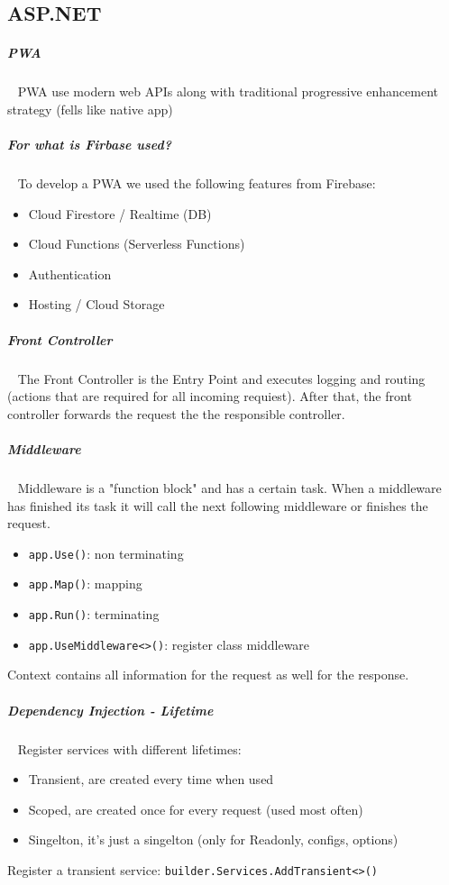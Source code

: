 \documentclass[10pt,twoside,landscape]{article}
\begin{document}
\begin{multicols}{4}
\section{ASP.NET}
\label{sec:orgca46951}
\subparagraph{PWA} \
\label{sec:orgbd677ad}
PWA use modern web APIs along with traditional progressive enhancement strategy (fells like native app)
\subparagraph{For what is Firbase used?} \
\label{sec:org692b7ac}
To develop a PWA we used the following features from Firebase:
\begin{itemize}
\item Cloud Firestore / Realtime (DB)
\item Cloud Functions (Serverless Functions)
\item Authentication
\item Hosting / Cloud Storage
\end{itemize}
\subparagraph{Front Controller} \
\label{sec:org8f6da09}
The Front Controller is the Entry Point and executes logging and routing (actions that are required for all incoming requiest).
After that, the front controller forwards the request the the responsible controller.
\subparagraph{Middleware} \
\label{sec:orgc3f0823}
Middleware is a "function block" and has a certain task.
When a middleware has finished its task it will call the next following middleware or finishes the request.
\begin{itemize}
\item \texttt{app.Use()}: non terminating
\item \texttt{app.Map()}: mapping
\item \texttt{app.Run()}: terminating
\item \texttt{app.UseMiddleware<>()}: register class middleware
\end{itemize}

Context contains all information for the request as well for the response.
\subparagraph{Dependency Injection - Lifetime} \
\label{sec:orgc36ff79}
Register services with different lifetimes:
\begin{itemize}
\item Transient, are created every time when used
\item Scoped, are created once for every request (used most often)
\item Singelton, it's just a singelton (only for Readonly, configs, options)
\end{itemize}


Register a transient service: \texttt{builder.Services.AddTransient<>()}



\end{multicols}
\end{document}
